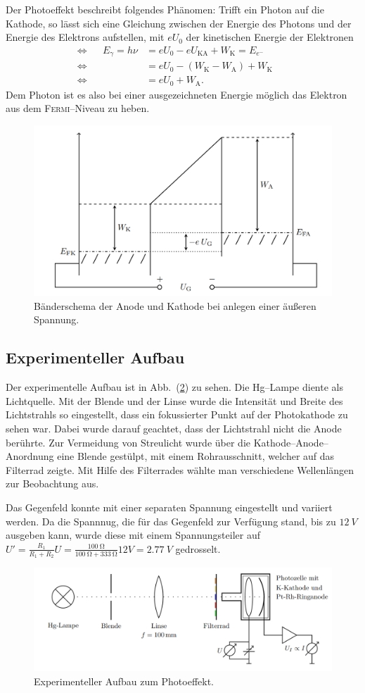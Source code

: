 \documentclass[sn-mathphys-num,iicol]{sn-jnl}
\theoremstyle{thmstyleone}
\theoremstyle{thmstyletwo}
\theoremstyle{thmstylethree}
\begin{document}
Der Photoeffekt beschreibt folgendes Phänomen: Trifft ein Photon auf die Kathode, so lässt sich eine Gleichung zwischen der Energie des Photons und der Energie des Elektrons aufstellen, mit $eU_0$ der kinetischen Energie der Elektronen
\begin{align} 
        \Leftrightarrow && E_\gamma =h\nu &=eU_0-eU_\text{KA}+W_\text{K}=E_{e^-}&&\\
        \Leftrightarrow &&&=eU_0-\left(W_\text{K}-W_\text{A}\right)+W_\text{K}&&\\
        \Leftrightarrow &&&=eU_0+W_\text{A}.&&
\end{align} 
Dem Photon ist es also bei einer ausgezeichneten Energie möglich das Elektron aus dem \textsc{Fermi}--Niveau zu heben.
\begin{figure}[t]
        \centering
        \includegraphics[width=.5\textwidth]{402_austrittsarbeit.png}
        \caption{Bänderschema der Anode und Kathode bei anlegen einer äußeren Spannung.\cite{Anleitung402}} \label{fig:bänderschema}
\end{figure}

\subsection{Experimenteller Aufbau}
Der experimentelle Aufbau ist in Abb.\ (\ref{fig:aufbau_photoeffekt}) zu sehen.
Die Hg--Lampe diente als Lichtquelle.
Mit der Blende und der Linse wurde die Intensität und Breite des Lichtstrahls so eingestellt, dass ein fokussierter Punkt auf der Photokathode zu sehen war.
Dabei wurde darauf geachtet, dass der Lichtstrahl nicht die Anode berührte.
Zur Vermeidung von Streulicht wurde über die Kathode--Anode--Anordnung eine Blende gestülpt, mit einem Rohrausschnitt, welcher auf das Filterrad zeigte.
Mit Hilfe des Filterrades wählte man verschiedene Wellenlängen zur Beobachtung aus.

Das Gegenfeld konnte mit einer separaten Spannung eingestellt und variiert werden.
Da die Spannnug, die für das Gegenfeld zur Verfügung stand, bis zu $\SI{12}{V}$ ausgeben kann, wurde diese mit einem Spannungsteiler auf $U'=\tfrac{R_1}{R_1+R_2}U=\tfrac{\SI{100}{\ohm}}{\SI{100}{\ohm}+\SI{333}{\ohm}}12V=\SI{2.77}{V}$ gedrosselt.
\begin{figure}[t]
        \centering
        \includegraphics[width=.5\textwidth]{402_aufbau_photoeffekt.png}
        \caption{Experimenteller Aufbau zum Photoeffekt.} \label{fig:aufbau_photoeffekt}
\end{figure}
\end{document}
